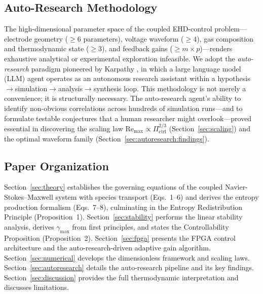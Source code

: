 \documentclass[12pt,twocolumn]{article}
\newcommand{\Pctrl}{\Pi_{\mathrm{ctrl}}}
\begin{document}
\subsection{Auto-Research Methodology}
\label{sec:intro:autoresearch}

The high-dimensional parameter space of the coupled
EHD-control problem---electrode geometry ($\geq 6$ parameters),
voltage waveform ($\geq 4$), gas composition and thermodynamic state
($\geq 3$), and feedback gains ($\geq m \times p$)---renders
exhaustive analytical or experimental exploration infeasible. We
adopt the \emph{auto-research} paradigm pioneered by Karpathy
\cite{Karpathy2025}, in which a large language model (LLM) agent
operates as an autonomous research assistant within a
hypothesis$\to$simulation$\to$analysis$\to$synthesis loop. This
methodology is not merely a convenience; it is structurally
necessary. The auto-research agent's ability to identify non-obvious
correlations across hundreds of simulation runs---and to formulate
testable conjectures that a human researcher might overlook---proved
essential in discovering the scaling law $\mathrm{Re}_{\max} \propto
\Pctrl^{2/3}$ (Section~\ref{sec:scaling}) and the optimal waveform
family (Section~\ref{sec:autoresearch:findings}).

\subsection{Paper Organization}

Section~\ref{sec:theory} establishes the governing equations of the
coupled Navier-Stokes--Maxwell system with species transport
(Eqs.~1--6) and derives the entropy production formalism (Eqs.~7--8),
culminating in the Entropy Redistribution Principle (Proposition~1).
Section~\ref{sec:stability} performs the linear stability analysis,
derives $\gamma_{\max}$ from first principles, and states the
Controllability Proposition (Proposition~2).
Section~\ref{sec:fpga} presents the FPGA control architecture and
the auto-research-driven adaptive gain algorithm.
Section~\ref{sec:numerical} develops the dimensionless framework
and scaling laws. Section~\ref{sec:autoresearch} details the
auto-research pipeline and its key findings.
Section~\ref{sec:discussion} provides the full thermodynamic
interpretation and discusses limitations.

\end{document}
